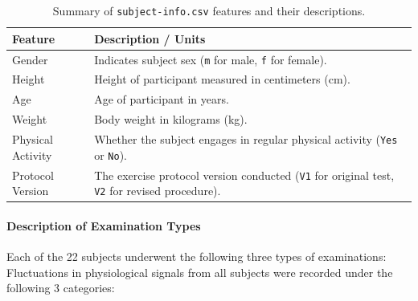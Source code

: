\documentclass[12pt,letterpaper]{article}
\begin{document}
\begin{table}[H]
\centering
\renewcommand{\arraystretch}{1.2} 
\setlength{\tabcolsep}{6pt} 
\caption{Summary of \texttt{subject-info.csv} features and their descriptions.}
\label{tab:wise-subject-info}
\begin{tabular}{p{3.5cm}p{10.5cm}}
\toprule
\textbf{Feature} & \textbf{Description / Units} \\
\midrule
Gender & Indicates subject sex (\texttt{m} for male, \texttt{f} for female). \\
Height & Height of participant measured in centimeters (cm). \\
Age & Age of participant in years. \\
Weight & Body weight in kilograms (kg). \\
Physical Activity & Whether the subject engages in regular physical activity (\texttt{Yes} or \texttt{No}). \\
Protocol Version & The exercise protocol version conducted (\texttt{V1} for original test, \texttt{V2} for revised procedure). \\
\bottomrule
\end{tabular}
\end{table}


\paragraph{Description of Examination Types}

Each of the 22 subjects underwent the following three types of examinations: Fluctuations in physiological signals from all subjects were recorded under the following 3 categories:
\end{document}
